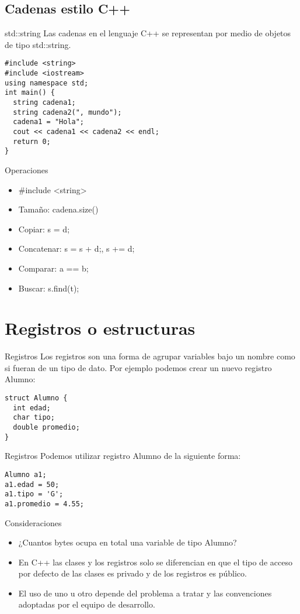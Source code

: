 \documentclass[aspectratio=169]{beamer}
\begin{document}
\subsection{Cadenas estilo C++}
\begin{frame}[fragile]{std::string}
Las cadenas en el lenguaje C++ se representan por medio de objetos de tipo std::string.
\begin{lstlisting}
#include <string>
#include <iostream>
using namespace std;
int main() {
  string cadena1;
  string cadena2(", mundo");
  cadena1 = "Hola";
  cout << cadena1 << cadena2 << endl;
  return 0;
}
\end{lstlisting}
\end{frame}
\begin{frame}{Operaciones}
\begin{itemize}
\item \#include <string> 
\item Tamaño: cadena.size()
\item Copiar: s = d;
\item Concatenar: s = s + d;, s += d;
\item Comparar: a == b;
\item Buscar: s.find(t);
\end{itemize}
\end{frame}
\section{Registros o estructuras}
\begin{frame}[fragile]{Registros}
Los registros son una forma de agrupar variables bajo un nombre como si fueran de un tipo de dato.
Por ejemplo podemos crear un nuevo registro Alumno:
\begin{lstlisting}
struct Alumno {
  int edad;
  char tipo;
  double promedio;
}
\end{lstlisting}
\end{frame}
\begin{frame}[fragile]{Registros}
Podemos utilizar registro Alumno de la siguiente forma:
\begin{lstlisting}
Alumno a1;
a1.edad = 50;
a1.tipo = 'G';
a1.promedio = 4.55;
\end{lstlisting}
\end{frame}
\begin{frame}{Consideraciones}
\begin{itemize}
\item ¿Cuantos bytes ocupa en total una variable de tipo Alumno?
\item En C++ las clases y los registros solo se diferencian en que el tipo de acceso por defecto de las clases es privado y de los registros es público.
\item El uso de uno u otro depende del problema a tratar y las convenciones adoptadas por el equipo de desarrollo.
\end{itemize}
\end{frame}
\end{document}
